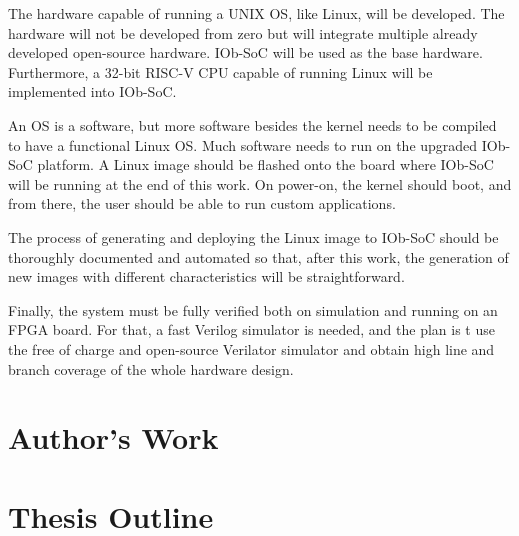 The hardware capable of running a UNIX OS, like Linux, will be developed. The hardware will not be developed from zero but will integrate multiple already developed open-source hardware. IOb-SoC will be used as the base hardware. Furthermore, a 32-bit RISC-V CPU capable of running Linux will be implemented into IOb-SoC.

An OS is a software, but more software besides the kernel needs to be compiled to have a functional Linux OS. Much software needs to run on the upgraded IOb-SoC platform. A Linux image should be flashed onto the board where IOb-SoC will be running at the end of this work. On power-on, the kernel should boot, and from there, the user should be able to run custom applications. 

The process of generating and deploying the Linux image to IOb-SoC should be thoroughly documented and automated so that, after this work, the generation of new images with different characteristics will be straightforward.

Finally, the system must be fully verified both on simulation and running on an FPGA board. For that, a fast Verilog simulator is needed, and the plan is t use the free of charge and open-source Verilator simulator and obtain high line and branch coverage of the whole hardware design.

\section{Author's Work}
\label{section:authors_work}

\section{Thesis Outline}
\label{section:thesis_outline}
